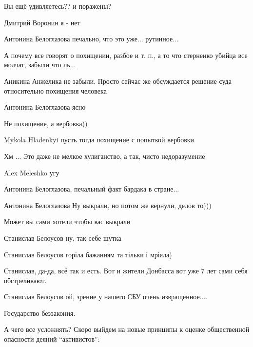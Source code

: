 \begin{itemize}

Вы ещё удивляетесь?? и поражены?

Дмитрий Воронин я - нет

Антонина Белоглазова печально, что это уже... рутинное...

А почему все говорят о похищении, разбое и т. п., а то что стерненко убийца все молчат, забыли что ль...

Аникина Анжелика не забыли. Просто сейчас же обсуждается решение суда относительно похищения человека


Антонина Белоглазова ясно


Не похищение, а вербовка))


Mykola Hladenkyi пусть тогда похищение с попыткой вербовки


Хм ... Это даже не мелкое хулиганство, а так, чисто недоразумение


Alex Meleshko угу

Антонина Белоглазова, печальный факт бардака в стране...

Антонина Белоглазова
Ну выкрали, но потом же вернули, делов то)))

Может вы сами хотели чтобы вас выкрали 

Станислав Белоусов ну, так себе шутка

Станислав Белоусов горіла бажанням та тільки і мріяла)

Станислав, да-да, всё так и есть. Вот и жители Донбасса вот уже 7 лет сами себя обстреливают.

Станислав Белоусов ой, зрение у нашего СБУ очень извращенное....

Государство беззакония.


А чего все усложнять? Скоро выйдем на новые принципы к оценке общественной
опасности деяний \enquote{активистов}: 


\end{itemize}
